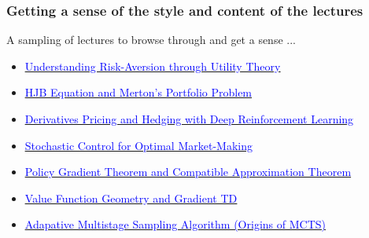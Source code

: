 \documentclass[handout]{beamer}
\begin{document}
\begin{frame}
\frametitle{Getting a sense of the style and content of the lectures}
A sampling of lectures to browse through and get a sense ...
\begin{itemize}
\item \href{https://github.com/coverdrive/technical-documents/blob/master/finance/cme241/UtilityTheoryForRisk.pdf}{\underline{\textcolor{blue}{Understanding Risk-Aversion through Utility Theory}}}
\item \href{https://github.com/coverdrive/technical-documents/blob/master/finance/cme241/MertonPortfolio.pdf}{\underline{\textcolor{blue}{HJB Equation and Merton's Portfolio Problem}}}
\item \href{https://github.com/coverdrive/technical-documents/blob/master/finance/cme241/DeepHedging.pdf}{\underline{\textcolor{blue}{Derivatives Pricing and Hedging with Deep Reinforcement Learning}}}
\item \href{https://github.com/coverdrive/technical-documents/blob/master/finance/cme241/MarketMaking.pdf}{\underline{\textcolor{blue}{Stochastic Control for Optimal Market-Making}}}
\item \href{https://github.com/coverdrive/technical-documents/blob/master/finance/cme241/PolicyGradient.pdf}{\underline{\textcolor{blue}{Policy Gradient Theorem and Compatible Approximation Theorem}}}
\item \href{https://github.com/coverdrive/technical-documents/blob/master/finance/cme241/ValueFunctionGeometry.pdf}{\underline{\textcolor{blue}{Value Function Geometry and Gradient TD}}}
\item \href{https://github.com/coverdrive/technical-documents/blob/master/finance/cme241/AdaptiveMultistageSampling.pdf}{\underline{\textcolor{blue}{Adapative Multistage Sampling Algorithm (Origins of MCTS)}}}
\end{itemize}
\end{frame}
\end{document}
